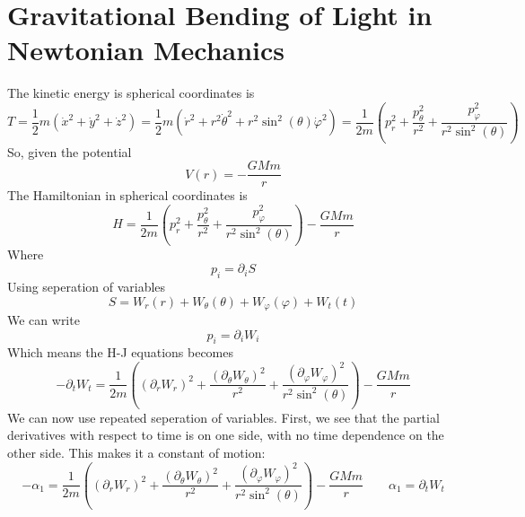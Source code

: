 \documentclass{article}
\begin{document}
\section{Gravitational Bending of Light in Newtonian Mechanics}
The kinetic energy is spherical coordinates is
\begin{equation}
    T = \frac{1}{2}m\left(
        \dot{x}^2 + \dot{y}^2 + \dot{z}^2
    \right) = \frac{1}{2}m\left(
        \dot{r}^2 + r^2\dot{\theta}^2 + r^2\sin^2(\theta)\dot{\varphi}^2
    \right) = \frac{1}{2m}\left(
        p_r^2 + \frac{p_\theta^2}{r^2} + \frac{p_\varphi^2}{r^2\sin^2(\theta)}
    \right)
\end{equation}
So, given the potential
\begin{equation}
    V(r) = -\frac{GMm}{r}
\end{equation}
The Hamiltonian in spherical coordinates is
\begin{equation}
    H = \frac{1}{2m}\left(
        p_r^2 + \frac{p_\theta^2}{r^2} + \frac{p_\varphi^2}{r^2\sin^2(\theta)}
    \right) - \frac{GMm}{r}
\end{equation}
Where
\begin{equation}
    p_i = \partial_i S
\end{equation}
Using seperation of variables
\begin{equation}
    S = W_r(r) + W_\theta(\theta) + W_\varphi(\varphi) + W_t(t)
\end{equation}
We can write
\begin{equation}
    p_i = \partial_i W_i
\end{equation}
Which means the H-J equations becomes
\begin{equation}
    - \partial_t W_t = \frac{1}{2m}\left(
        \left(\partial_r W_r\right)^2 + \frac{\left(\partial_\theta W_\theta\right)^2}{r^2} + \frac{\left(\partial_\varphi W_\varphi\right)^2}{r^2\sin^2(\theta)}
    \right) - \frac{GMm}{r}
\end{equation}
We can now use repeated seperation of variables. First, we see that the partial derivatives with respect to time is on one side, with no time dependence on the other side. This makes it a constant of motion:
\begin{equation}
    - \alpha_1 = \frac{1}{2m}\left(
        \left(\partial_r W_r\right)^2 + \frac{\left(\partial_\theta W_\theta\right)^2}{r^2} + \frac{\left(\partial_\varphi W_\varphi\right)^2}{r^2\sin^2(\theta)}
    \right) - \frac{GMm}{r}
    \qquad
    \alpha_1 = \partial_t W_t
\end{equation}
\end{document}
